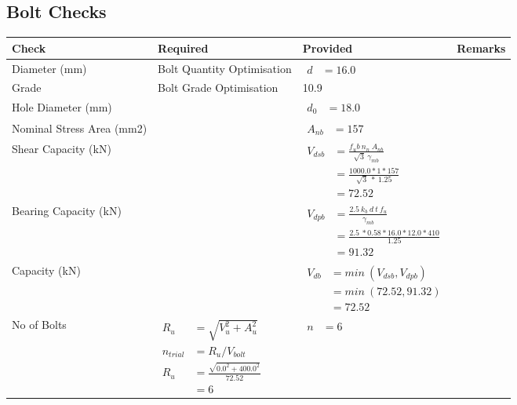 \documentclass{article}%
\begin{document}
\subsection{Bolt Checks}%
\label{subsec:BoltChecks}%
\renewcommand{\arraystretch}{1.2}%
\begin{longtable}{|p{2.5cm}|p{5.5cm}|p{7cm}|p{1cm}|}%
\hline%
\rowcolor{OsdagGreen}%
Check&Required&Provided&Remarks\\%
\hline%
\endhead%
\hline%
Diameter (mm)&Bolt Quantity Optimisation&$\begin{aligned} d &=16.0 \end{aligned}$&\\%
\hline%
Grade&Bolt Grade Optimisation&10.9&\\%
\hline%
Hole Diameter (mm)& &$\begin{aligned} d_0 &=18.0 \end{aligned}$&\\%
\hline%
Nominal Stress Area (mm2)& &$\begin{aligned} A_{nb} &=157 \end{aligned}$&\\%
\hline%
Shear Capacity (kN)&&$\begin{aligned}V_{dsb} &= \frac{f_ub ~n_n~ A_{nb}}{\sqrt{3} ~\gamma_{mb}}\\ &= \frac{1000.0*1*157}{\sqrt{3}~*~1.25}\\ &= 72.52\end{aligned}$&\\%
\hline%
Bearing Capacity (kN)&&$\begin{aligned}V_{dpb} &= \frac{2.5~ k_b~ d~ t~ f_u}{\gamma_{mb}}\\ &= \frac{2.5~*0.58*16.0*12.0*410}{1.25}\\ &=91.32\end{aligned}$&\\%
\hline%
Capacity (kN)&&$\begin{aligned}V_{db} &= min~ (V_{dsb}, V_{dpb})\\ &= min~ (72.52,91.32)\\ &=72.52\end{aligned}$&\\%
\hline%
No of Bolts&$\begin{aligned}R_{u} &= \sqrt{V_u^2+A_u^2}\\ n_{trial} &= R_u/ V_{bolt}\\ R_{u} &= \frac{\sqrt{0.0^2+400.0^2}}{72.52}\\ &=6\end{aligned}$&$\begin{aligned} n &=6 \end{aligned}$&\\%

\end{longtable}
\end{document}
